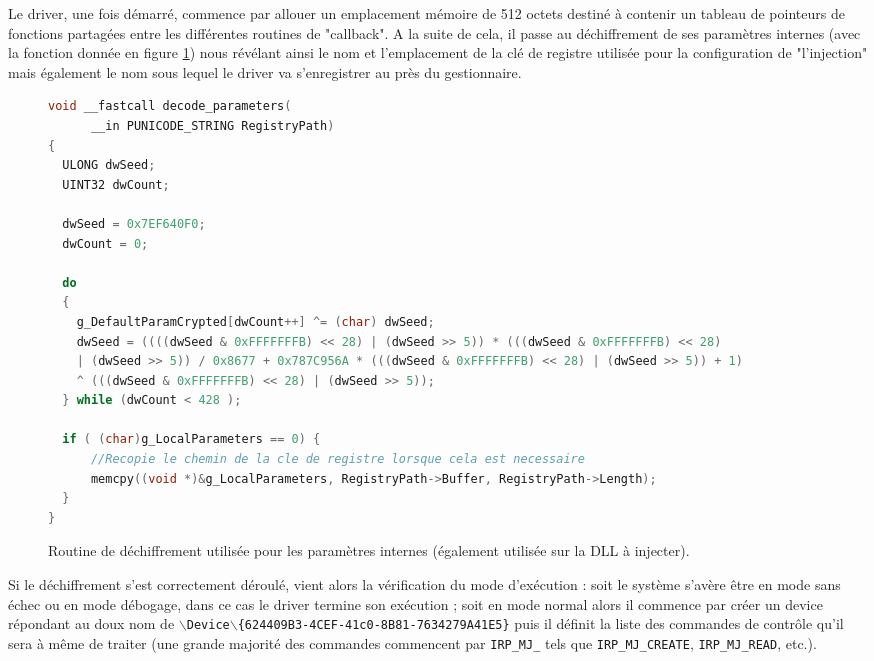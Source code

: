 Le driver, une fois démarré, commence par allouer un emplacement mémoire de 512 octets destiné à contenir un tableau de pointeurs de fonctions partagées entre les différentes routines de "callback". A la suite de cela, il passe au déchiffrement de ses paramètres internes (avec la fonction donnée en figure \ref{fig:AThierry_decrypt}) nous révélant ainsi le nom et l'emplacement de la clé de registre utilisée pour la configuration de "l'injection" mais également le nom sous lequel le driver va s'enregistrer au près du gestionnaire.  
\begin{figure}
\scriptsize
\begin{changemargin}{-1cm}{-1cm}
\begin{lstlisting}[language={C}]
 void __fastcall decode_parameters(
      __in PUNICODE_STRING RegistryPath)
{
  ULONG dwSeed; 
  UINT32 dwCount; 

  dwSeed = 0x7EF640F0;
  dwCount = 0;
  
  do
  {
    g_DefaultParamCrypted[dwCount++] ^= (char) dwSeed;
    dwSeed = ((((dwSeed & 0xFFFFFFFB) << 28) | (dwSeed >> 5)) * (((dwSeed & 0xFFFFFFFB) << 28) 
    | (dwSeed >> 5)) / 0x8677 + 0x787C956A * (((dwSeed & 0xFFFFFFFB) << 28) | (dwSeed >> 5)) + 1) 
    ^ (((dwSeed & 0xFFFFFFFB) << 28) | (dwSeed >> 5));
  } while (dwCount < 428 );

  if ( (char)g_LocalParameters == 0) { 
      //Recopie le chemin de la cle de registre lorsque cela est necessaire
      memcpy((void *)&g_LocalParameters, RegistryPath->Buffer, RegistryPath->Length);
  }
}
\end{lstlisting}
\end{changemargin}
\caption{Routine de déchiffrement utilisée pour les paramètres internes (également utilisée sur la DLL à injecter).}
\label{fig:AThierry_decrypt}
\end{figure}



Si le déchiffrement s'est correctement déroulé, vient alors la vérification du mode d'exécution : soit le système s'avère être en mode sans échec ou en mode débogage, dans ce cas le driver termine son exécution ; soit en mode normal alors il commence par créer un device répondant au doux nom de $\backslash$\texttt{Device}$\backslash$\texttt{\{624409B3-4CEF-41c0-8B81-7634279A41E5\}} puis il définit la liste des commandes de contrôle qu'il sera à même de traiter (une grande majorité des commandes commencent par  \texttt{IRP\_MJ\_} tels que \texttt{IRP\_MJ\_CREATE}, \texttt{IRP\_MJ\_READ}, etc.).

